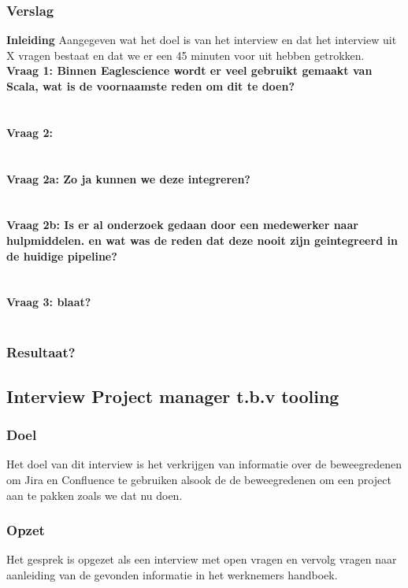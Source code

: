 \subsubsection{Verslag}
\textbf{Inleiding}
Aangegeven wat het doel is van het interview en dat het interview uit X vragen bestaat en dat we er een 45 minuten voor uit hebben getrokken.\\
\textbf{Vraag 1: Binnen Eaglescience wordt er veel gebruikt gemaakt van Scala, wat is de voornaamste reden om dit te doen?}\\
\lipsum[01]\\
\\
\textbf{Vraag 2:}\\
\lipsum[02]\\
\\
\textbf{Vraag 2a: Zo ja kunnen we deze integreren?}\\
\lipsum[03]\\
\\
\textbf{Vraag 2b: Is er al onderzoek gedaan door een medewerker naar hulpmiddelen. en wat was de reden dat deze nooit zijn geintegreerd in de huidige pipeline?}\\
\lipsum[04]\\
\\
\textbf{Vraag 3: blaat?}\\
\lipsum[05]\\

\subsubsection{Resultaat?}

\subsection{Interview Project manager t.b.v tooling}
\subsubsection{Doel}
Het doel van dit interview is het verkrijgen van informatie over de beweegredenen om Jira en Confluence te gebruiken alsook de de beweegredenen om een project aan te pakken zoals we dat nu doen.
\subsubsection{Opzet}
Het gesprek is opgezet als een interview met open vragen en vervolg vragen naar aanleiding van de gevonden informatie in het werknemers handboek.
